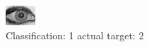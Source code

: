 \begin{figure}[h!]
\begin{center}
\includegraphics[width=0.60\columnwidth]{figures/ID2027_class_1_target_2.png}
\end{center}
\caption{ Classification: 1 actual target: 2}
\label{fig:ID2027_class_1_target_2}
\end{figure}
